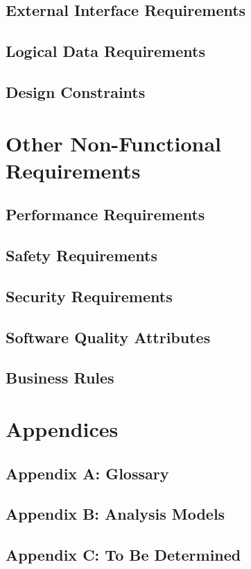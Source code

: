 \documentclass[11pt]{article}
\begin{document}
\subsection{External Interface Requirements}
\label{sec:external-interface}

\subsection{Logical Data Requirements}
\label{sec:logical}

\subsection{Design Constraints}
\label{sec:constraints}

\section{Other Non-Functional Requirements}
\label{sec:non-functional}

\subsection{Performance Requirements}
\label{sec:performance}

\subsection{Safety Requirements}
\label{sec:safety}

\subsection{Security Requirements}
\label{sec:security}

\subsection{Software Quality Attributes}
\label{sec:quality}

\subsection{Business Rules}
\label{sec:business}

\section{Appendices}
\label{sec:appendices}

\subsection{Appendix A: Glossary}
\label{sec:glossary}

\subsection{Appendix B: Analysis Models}
\label{sec:analysis}

\subsection{Appendix C: To Be Determined}
\label{sec:tbd}


\end{document}
